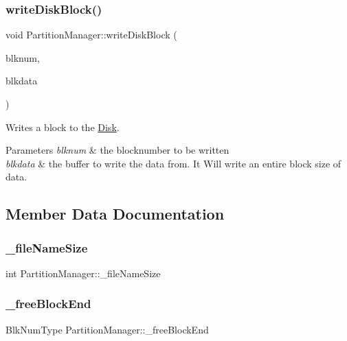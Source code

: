 \subsubsection{\texorpdfstring{write\+Disk\+Block()}{writeDiskBlock()}}
{\footnotesize\ttfamily void Partition\+Manager\+::write\+Disk\+Block (\begin{DoxyParamCaption}\item[{Blk\+Num\+Type}]{blknum,  }\item[{char $\ast$}]{blkdata }\end{DoxyParamCaption})}

Writes a block to the \mbox{\hyperlink{class_disk}{Disk}}. 
\begin{DoxyParams}{Parameters}
{\em blknum} & the blocknumber to be written \\
\hline
{\em blkdata} & the buffer to write the data from. It Will write an entire block size of data. \\
\hline
\end{DoxyParams}


\subsection{Member Data Documentation}
\mbox{\label{class_partition_manager_aa934a144c41a546a83c80965428bc0dd}} 
\subsubsection{\texorpdfstring{\+\_\+file\+Name\+Size}{\_fileNameSize}}
{\footnotesize\ttfamily int Partition\+Manager\+::\+\_\+file\+Name\+Size\hspace{0.3cm}{\ttfamily [private]}}

\mbox{\label{class_partition_manager_a76dddfb3211f1a6bb428ea883c16f9fe}} 
\subsubsection{\texorpdfstring{\+\_\+free\+Block\+End}{\_freeBlockEnd}}
{\footnotesize\ttfamily Blk\+Num\+Type Partition\+Manager\+::\+\_\+free\+Block\+End\hspace{0.3cm}{\ttfamily [private]}}

